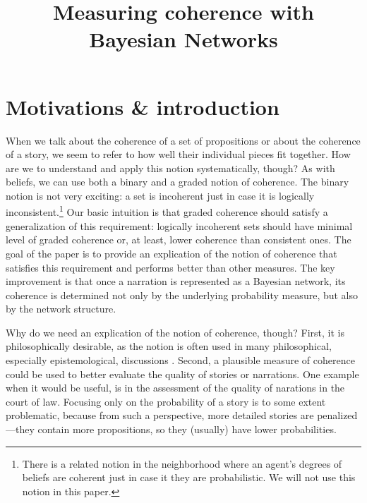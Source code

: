 \documentclass[10pt,]{scrartcl}
\title{Measuring coherence with Bayesian Networks}
\author{}
\date{\vspace{-2.5em}}
\begin{document}
\maketitle
\tableofcontents

\section{Motivations \& introduction}


When we talk about the coherence of a set of propositions or about the
coherence of a story, we seem to refer to how well their individual
pieces fit together. How are we to understand and apply this notion
systematically, though?  As with beliefs, we can use both a binary and a graded notion of coherence. The binary notion is not very exciting: a set is incoherent
just in case it is logically
inconsistent.\footnote{There is a related notion in the neighborhood where an agent's  degrees of beliefs are coherent just in case it they are probabilistic. We will not use this notion in this paper.}  Our basic intuition is that graded coherence should satisfy  a generalization of this requirement: logically incoherent sets should have minimal level of graded coherence or, at least, lower coherence than consistent ones.  The goal of the paper is to provide an explication of the notion of coherence    that satisfies this requirement and  performs better than other measures. The key improvement  is that  once a narration is represented as a Bayesian network, its coherence is determined not only by the underlying probability measure, but also by the network structure. 



Why do we need an explication of the notion of coherence, though? 
First, it is philosophically desirable, as  the notion is often used in many philosophical, especially
epistemological, discussions \citep[for instance, in discussions about the truth-conduciveness of coherence,][]{shogenji1999conducive,olsson2001conducive}.  Second, a  plausible measure of coherence could be used to better evaluate the quality of  stories or narrations. One example  when it would be useful, is in the assessment of the quality of  narations in the court of law. Focusing only on the probability of a story is to some extent problematic, because from such a perspective, more detailed stories are penalized---they contain more propositions, so they (usually) have lower probabilities.  
\end{document}
